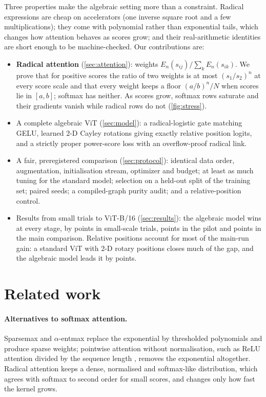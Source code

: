 \documentclass[10pt]{article}
\begin{document}
Three properties make the algebraic setting more than a constraint. Radical
expressions are cheap on accelerators (one inverse square root and a few
multiplications); they come with polynomial rather than exponential
tails, which changes how attention behaves as scores grow; and their
real-arithmetic identities are short enough to be machine-checked. Our
contributions are:
\begin{itemize}
\item \textbf{Radical attention} (\cref{sec:attention}): weights
  $E_n(s_{ij})/\sum_k E_n(s_{ik})$. We prove that for positive scores the
  ratio of two weights is at most $(s_1/s_2)^n$ at every score scale and
  that every weight keeps a floor $(a/b)^n/N$ when scores lie in $[a,b]$;
  softmax has neither. As scores grow, softmax rows saturate and their
  gradients vanish while radical rows do not (\cref{fig:stress}).
\item A complete algebraic ViT (\cref{sec:model}): a radical-logistic gate
  matching GELU, learned 2-D Cayley rotations giving exactly relative
  position logits, and a strictly proper power-score loss with an
  overflow-proof radical link.
\item A fair, preregistered comparison (\cref{sec:protocol}): identical data
  order, augmentation, initialisation stream, optimizer and budget; at least
  as much tuning for the standard model; selection on a held-out split of
  the training set; paired seeds; a compiled-graph purity audit; and a
  relative-position control.
\item Results from small trials to ViT-B/16 (\cref{sec:results}): the
  algebraic model wins at every stage, by \microDiff{} points in
  small-scale trials, \pilotDiff{} points in the pilot and \mainDiff{}
  points in the main comparison. Relative positions account for most of
  the main-run gain: a standard ViT with 2-D rotary positions closes much
  of the gap, and the algebraic model leads it by \mainAlgRopeDiff{}
  points.
\end{itemize}

\section{Related work}

\paragraph{Alternatives to softmax attention.} Sparsemax and
$\alpha$-entmax \cite{martins2016sparsemax,peters2019entmax} replace the
exponential by thresholded polynomials and produce sparse weights;
pointwise attention without normalisation, such as ReLU attention divided by
the sequence length \cite{wortsman2023relu}, removes the exponential
altogether. Radical attention keeps a dense, normalised and softmax-like
distribution, which agrees with softmax to second order for small scores,
and changes only how fast the kernel grows.
\end{document}
